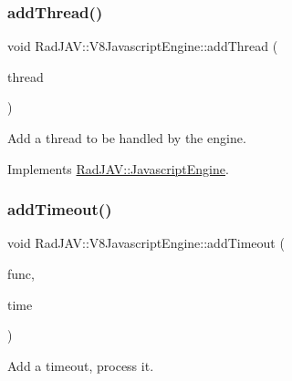 \subsubsection{\texorpdfstring{add\+Thread()}{addThread()}}
{\footnotesize\ttfamily void Rad\+J\+A\+V\+::\+V8\+Javascript\+Engine\+::add\+Thread (\begin{DoxyParamCaption}\item[{\mbox{\hyperlink{class_rad_j_a_v_1_1_thread}{Thread}} $\ast$}]{thread }\end{DoxyParamCaption})\hspace{0.3cm}{\ttfamily [virtual]}}



Add a thread to be handled by the engine. 



Implements \mbox{\hyperlink{class_rad_j_a_v_1_1_javascript_engine_abfbd3bff5d4eb0e36d3d18347495bbd7}{Rad\+J\+A\+V\+::\+Javascript\+Engine}}.

\mbox{\label{class_rad_j_a_v_1_1_v8_javascript_engine_ad2c9ab23eb0f84c5776afb6e9e2ed006}} 
\subsubsection{\texorpdfstring{add\+Timeout()}{addTimeout()}}
{\footnotesize\ttfamily void Rad\+J\+A\+V\+::\+V8\+Javascript\+Engine\+::add\+Timeout (\begin{DoxyParamCaption}\item[{v8\+::\+Persistent$<$ v8\+::\+Function $>$ $\ast$}]{func,  }\item[{R\+J\+I\+NT}]{time }\end{DoxyParamCaption})}



Add a timeout, process it. 

\mbox{\label{class_rad_j_a_v_1_1_v8_javascript_engine_a13490748bc843ae2d2be22aa889e8e30}} 
